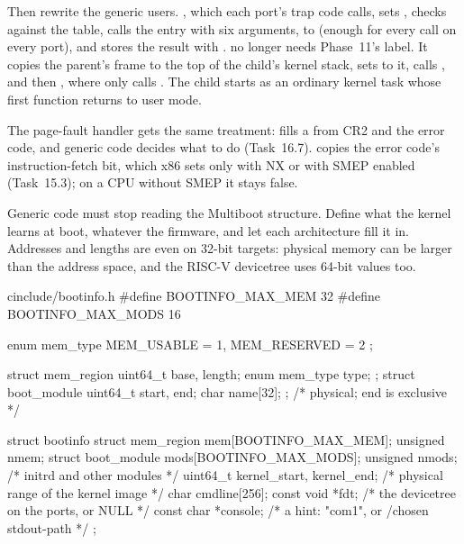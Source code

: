 \documentclass[11pt,a4paper]{article}
\begin{document}
Then rewrite the generic users. , which each port's trap code calls, sets
, checks  against the table, calls the entry with six 
arguments,  to  (enough for every call on every port), and stores the result
with .  no longer needs Phase~11's  label. It copies the parent's frame to
the top of the child's kernel stack, sets  to it, calls , and then
, where  only calls
. The child starts as an ordinary kernel task whose first function returns to user mode.

The page-fault handler gets the same treatment:  fills a  from CR2 and
the error code, and generic code decides what to do (Task~16.7).  copies the error code's
instruction-fetch bit, which x86 sets only with NX or with SMEP enabled (Task~15.3); on a CPU without SMEP it stays
false.

Generic code must stop reading the Multiboot structure. Define what the kernel learns at boot, whatever the firmware,
and let each architecture fill it in. Addresses and lengths are  even on 32-bit targets: physical
memory can be larger than the address space, and the RISC-V devicetree uses 64-bit values too.

\begin{lst}{c}{include/bootinfo.h}
#define BOOTINFO_MAX_MEM  32
#define BOOTINFO_MAX_MODS 16

enum mem_type { MEM_USABLE = 1, MEM_RESERVED = 2 };

struct mem_region  { uint64_t base, length; enum mem_type type; };
struct boot_module { uint64_t start, end; char name[32]; };  /* physical; end is exclusive */

struct bootinfo {
    struct mem_region  mem[BOOTINFO_MAX_MEM];   unsigned nmem;
    struct boot_module mods[BOOTINFO_MAX_MODS]; unsigned nmods;   /* initrd and other modules */
    uint64_t           kernel_start, kernel_end;    /* physical range of the kernel image   */
    char               cmdline[256];
    const void        *fdt;                         /* the devicetree on the ports, or NULL */
    const char        *console;                     /* a hint: "com1", or /chosen stdout-path */
};
\end{lst}
\end{document}
